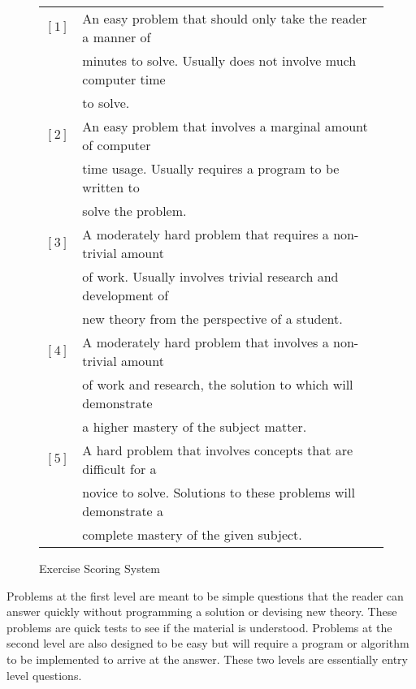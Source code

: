 \documentclass[b5paper]{book}
\begin{document}
\begin{figure}[here]
\begin{center}
\begin{small}
\begin{tabular}{|c|l|}
\hline $\left [ 1 \right ]$ & An easy problem that should only take the reader a manner of \\
                            & minutes to solve.  Usually does not involve much computer time \\
                            & to solve. \\
\hline $\left [ 2 \right ]$ & An easy problem that involves a marginal amount of computer \\
                     & time usage.  Usually requires a program to be written to \\
                     & solve the problem. \\
\hline $\left [ 3 \right ]$ & A moderately hard problem that requires a non-trivial amount \\
                     & of work.  Usually involves trivial research and development of \\
                     & new theory from the perspective of a student. \\
\hline $\left [ 4 \right ]$ & A moderately hard problem that involves a non-trivial amount \\
                     & of work and research, the solution to which will demonstrate \\
                     & a higher mastery of the subject matter. \\
\hline $\left [ 5 \right ]$ & A hard problem that involves concepts that are difficult for a \\
                     & novice to solve.  Solutions to these problems will demonstrate a \\
                     & complete mastery of the given subject. \\
\hline
\end{tabular}
\end{small}
\end{center}
\caption{Exercise Scoring System}
\end{figure}

Problems at the first level are meant to be simple questions that the reader can answer quickly without programming a solution or
devising new theory.  These problems are quick tests to see if the material is understood.  Problems at the second level 
are also designed to be easy but will require a program or algorithm to be implemented to arrive at the answer.  These
two levels are essentially entry level questions.  
\end{document}
